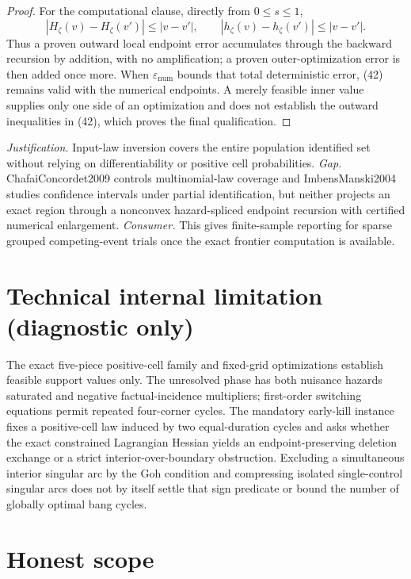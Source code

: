 \documentclass{article}
\begin{document}
\begin{proof}
For the computational clause, directly from \(0\le s\le1\),
\[
 |H_\zeta(v)-H_\zeta(v')|\le|v-v'|,
 \quad\quad |h_\zeta(v)-h_\zeta(v')|\le|v-v'|.                \tag{43}
\]
Thus a proven outward local endpoint error accumulates through the backward recursion by addition, with no amplification; a proven outer-optimization error is then added once more.  When \(\varepsilon_{\mathrm{num}}\) bounds that total deterministic error, (42) remains valid with the numerical endpoints.  A merely feasible inner value supplies only one side of an optimization and does not establish the outward inequalities in (42), which proves the final qualification.
\end{proof}
\par\smallskip\noindent \textit{Justification.} Input-law inversion covers the entire population identified set without relying on differentiability or positive cell probabilities. \textit{Gap.} ChafaiConcordet2009 controls multinomial-law coverage and ImbensManski2004 studies confidence intervals under partial identification, but neither projects an exact region through a nonconvex hazard-spliced endpoint recursion with certified numerical enlargement. \textit{Consumer.} This gives finite-sample reporting for sparse grouped competing-event trials once the exact frontier computation is available.

\section*{Technical internal limitation (diagnostic only)}

The exact five-piece positive-cell family and fixed-grid optimizations establish feasible support values only. The unresolved phase has both nuisance hazards saturated and negative factual-incidence multipliers; first-order switching equations permit repeated four-corner cycles. The mandatory early-kill instance fixes a positive-cell law induced by two equal-duration cycles and asks whether the exact constrained Lagrangian Hessian yields an endpoint-preserving deletion exchange or a strict interior-over-boundary obstruction. Excluding a simultaneous interior singular arc by the Goh condition and compressing isolated single-control singular arcs does not by itself settle that sign predicate or bound the number of globally optimal bang cycles.

\section{Honest scope}
\end{document}
